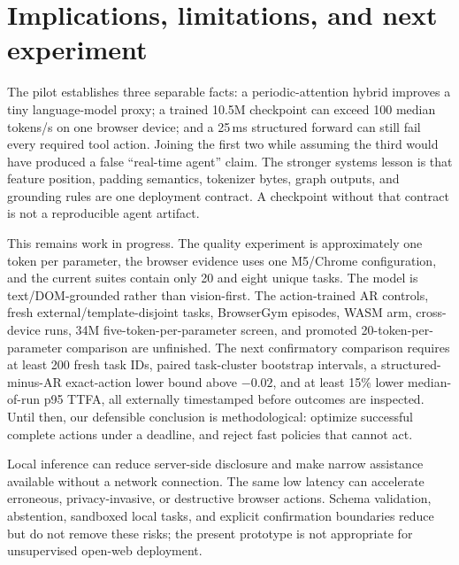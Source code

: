 \documentclass{article}
\begin{document}
\section{Implications, limitations, and next experiment}

The pilot establishes three separable facts: a periodic-attention hybrid improves a tiny
language-model proxy; a trained 10.5M checkpoint can exceed 100 median tokens/s on one browser
device; and a 25\,ms structured forward can still fail every required tool action.  Joining the
first two while assuming the third would have produced a false ``real-time agent'' claim.  The
stronger systems lesson is that feature position, padding semantics, tokenizer bytes, graph
outputs, and grounding rules are one deployment contract.  A checkpoint without that contract is
not a reproducible agent artifact.

This remains work in progress.  The quality experiment is approximately one token per parameter,
the browser evidence uses one M5/Chrome configuration, and the current suites contain only 20 and
eight unique tasks.  The model is text/DOM-grounded rather than vision-first.  The action-trained
AR controls, fresh external/template-disjoint tasks, BrowserGym episodes, WASM arm, cross-device
runs, 34M five-token-per-parameter screen, and promoted 20-token-per-parameter comparison are
unfinished.  The next confirmatory comparison requires at least 200 fresh task IDs, paired
task-cluster bootstrap intervals, a structured-minus-AR exact-action lower bound above \(-0.02\),
and at least 15\% lower median-of-run p95 TTFA, all externally timestamped before outcomes are
inspected.  Until then, our defensible conclusion is methodological: optimize successful complete
actions under a deadline, and reject fast policies that cannot act.

Local inference can reduce server-side disclosure and make narrow assistance available without a
network connection.  The same low latency can accelerate erroneous, privacy-invasive, or
destructive browser actions.  Schema validation, abstention, sandboxed local tasks, and explicit
confirmation boundaries reduce but do not remove these risks; the present prototype is not
appropriate for unsupervised open-web deployment.





\end{document}
